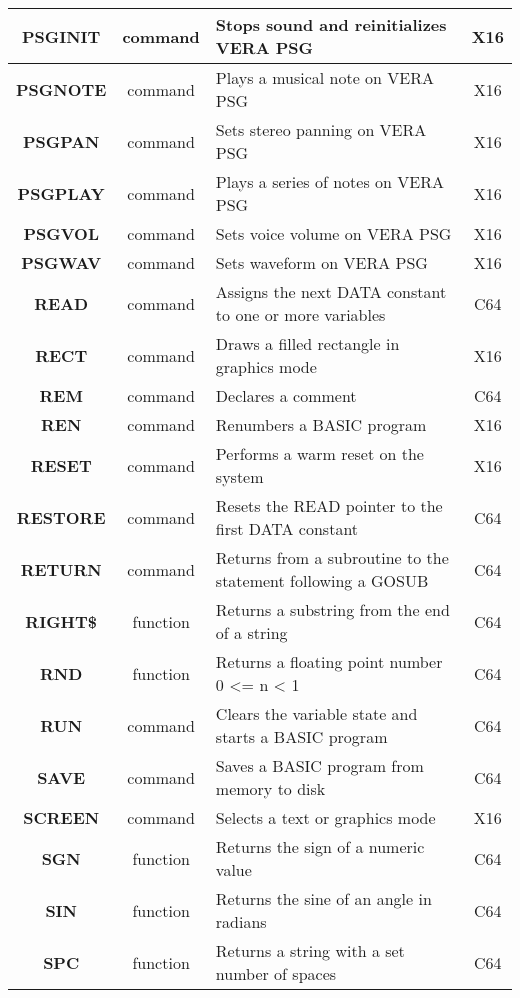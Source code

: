 \begin{longtable}{|c|c|m{4cm}|c|}
	{\bfseries PSGINIT} & command & Stops sound and reinitializes VERA PSG & X16 \\ \hline
	{\bfseries PSGNOTE} & command & Plays a musical note on VERA PSG & X16 \\ \hline
	{\bfseries PSGPAN} & command & Sets stereo panning on VERA PSG & X16 \\ \hline
	{\bfseries PSGPLAY} & command & Plays a series of notes on VERA PSG & X16 \\ \hline
	{\bfseries PSGVOL} & command & Sets voice volume on VERA PSG & X16 \\ \hline
	{\bfseries PSGWAV} & command & Sets waveform on VERA PSG & X16 \\ \hline
	{\bfseries READ} & command & Assigns the next {\ttfamily DATA} constant to one or more variables & C64 \\ \hline
	{\bfseries RECT} & command & Draws a filled rectangle in graphics mode & X16 \\ \hline
	{\bfseries REM} & command & Declares a comment & C64 \\ \hline
	{\bfseries REN} & command & Renumbers a BASIC program & X16 \\ \hline
	{\bfseries RESET} & command & Performs a warm reset on the system & X16 \\ \hline
	{\bfseries RESTORE} & command & Resets the {\ttfamily READ} pointer to the first {\ttfamily DATA} constant & C64 \\ \hline
	{\bfseries RETURN} & command & Returns from a subroutine to the statement following a GOSUB & C64 \\ \hline
	{\bfseries RIGHT\$} & function & Returns a substring from the end of a string & C64 \\ \hline
	{\bfseries RND} & function & Returns a floating point number 0 <= n < 1 & C64 \\ \hline
	{\bfseries RUN} & command & Clears the variable state and starts a BASIC program & C64 \\ \hline
	{\bfseries SAVE} & command & Saves a BASIC program from memory to disk & C64 \\ \hline
	{\bfseries SCREEN} & command & Selects a text or graphics mode & X16 \\ \hline
	{\bfseries SGN} & function & Returns the sign of a numeric value & C64 \\ \hline
	{\bfseries SIN} & function & Returns the sine of an angle in radians & C64 \\ \hline
	{\bfseries SPC} & function & Returns a string with a set number of spaces & C64 \\ \hline

\end{longtable}
